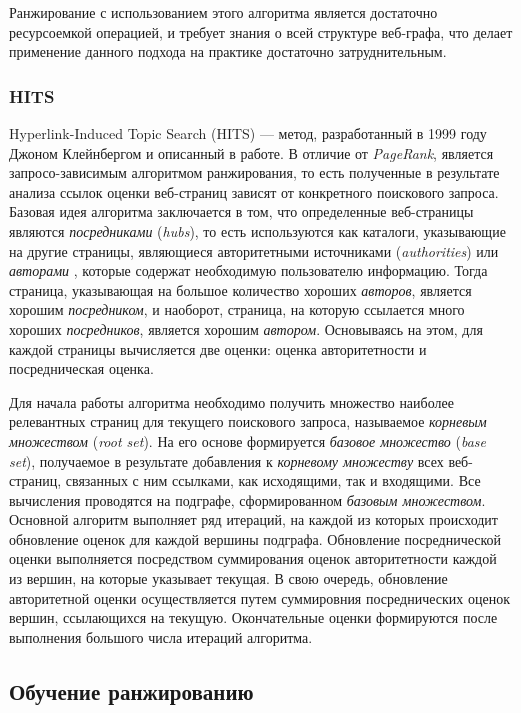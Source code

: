 Ранжирование с использованием этого алгоритма является достаточно ресурсоемкой операцией, и требует знания о всей структуре веб-графа, что делает применение данного подхода на практике достаточно затруднительным.

\subsubsection*{HITS}

Hyperlink-Induced Topic Search (HITS) --- метод, разработанный в 1999 году Джоном Клейнбергом и описанный в работе. В отличие от \textit{PageRank}, является запросо-зависимым алгоритмом ранжирования, то есть полученные в результате анализа ссылок оценки веб-страниц зависят от конкретного поискового запроса. Базовая идея алгоритма заключается в том, что определенные веб-страницы являются \textit{посредниками} (\textit{hubs}), то есть используются как каталоги, указывающие на другие страницы, являющиеся авторитетными источниками (\textit{authorities}) или \textit{авторами} \cite{wiki_hits}, которые содержат необходимую пользователю информацию. Тогда страница, указывающая на большое количество хороших \textit{авторов}, является хорошим \textit{посредником}, и наоборот, страница, на которую ссылается много хороших \textit{посредников}, является хорошим \textit{автором}. Основываясь на этом, для каждой страницы вычисляется две оценки: оценка авторитетности и посредническая оценка. 

Для начала работы алгоритма необходимо получить множество наиболее релевантных страниц для текущего поискового запроса, называемое \textit{корневым множеством} (\textit{root set}). На его основе формируется \textit{базовое множество} (\textit{base set}), получаемое в результате добавления к \textit{корневому множеству} всех веб-страниц, связанных с ним ссылками, как исходящими, так и входящими. Все вычисления проводятся на подграфе, сформированном \textit{базовым множеством}. Основной алгоритм выполняет ряд итераций, на каждой из которых происходит обновление оценок для каждой вершины подграфа. Обновление посреднической оценки выполняется посредством суммирования оценок авторитетности каждой из вершин, на которые указывает текущая. В свою очередь, обновление авторитетной оценки осуществляется путем суммировния посреднических оценок вершин, ссылающихся на текущую. Окончательные оценки формируются после выполнения большого числа итераций алгоритма.

\subsection{Обучение ранжированию}

